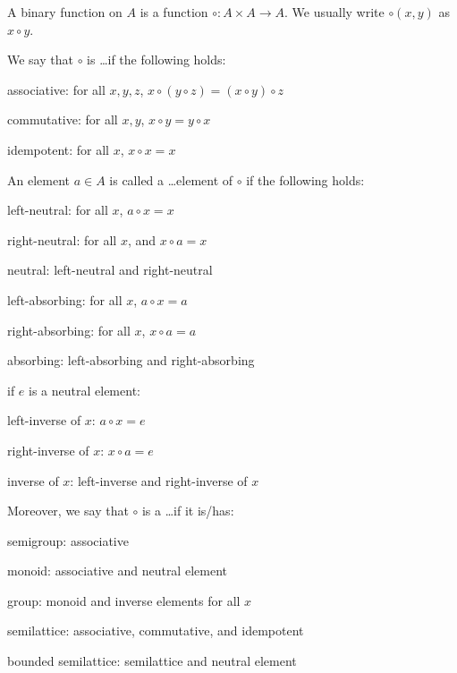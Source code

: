 A binary function on $A$ is a function $\circ: A\times A\to A$.
We usually write $\circ(x,y)$ as $x\circ y$.

\begin{definition}\label{def:math:binop}
We say that $\circ$ is \ldots if the following holds:
\begin{compactitem}
 \item associative: for all $x,y,z$, $x\circ(y\circ z)=(x\circ y)\circ z$
 \item commutative: for all $x,y$, $x\circ y=y\circ x$
 \item idempotent: for all $x$, $x\circ x=x$
\end{compactitem}

An element $a\in A$ is called a \ldots element of $\circ$ if the following holds:
 \begin{compactitem}
  \item left-neutral: for all $x$, $a\circ x=x$
  \item right-neutral: for all $x$, and $x\circ a=x$
  \item neutral: left-neutral and right-neutral
  \item left-absorbing: for all $x$, $a\circ x=a$
  \item right-absorbing: for all $x$, $x\circ a=a$
  \item absorbing: left-absorbing and right-absorbing
  \item if $e$ is a neutral element:
   \begin{compactitem}
     \item left-inverse of $x$: $a\circ x=e$
     \item right-inverse of $x$: $x\circ a=e$
     \item inverse of $x$: left-inverse and right-inverse of $x$
   \end{compactitem}
 \end{compactitem}
 
Moreover, we say that $\circ$ is a \ldots if it is/has:
\begin{compactitem}
 \item semigroup: associative
 \item monoid: associative and neutral element
 \item group: monoid and inverse elements for all $x$
 \item semilattice: associative, commutative, and idempotent
 \item bounded semilattice: semilattice and neutral element
\end{compactitem}
\end{definition}

